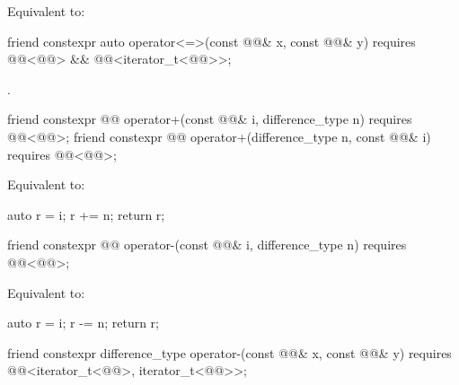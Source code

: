 \begin{itemdescr}
\pnum
\effects
Equivalent to: 
\end{itemdescr}

%
\begin{itemdecl}
friend constexpr auto operator<=>(const @@& x, const @@& y)
  requires @@<@@> && @@<iterator_t<@@>>;
\end{itemdecl}

\begin{itemdescr}
\pnum
\returns
{}.
\end{itemdescr}

%
\begin{itemdecl}
friend constexpr @@ operator+(const @@& i, difference_type n)
  requires @@<@@>;
friend constexpr @@ operator+(difference_type n, const @@& i)
  requires @@<@@>;
\end{itemdecl}

\begin{itemdescr}
\pnum
\effects
Equivalent to:
\begin{codeblock}
auto r = i;
r += n;
return r;
\end{codeblock}
\end{itemdescr}

%
\begin{itemdecl}
friend constexpr @@ operator-(const @@& i, difference_type n)
  requires @@<@@>;
\end{itemdecl}

\begin{itemdescr}
\pnum
\effects
Equivalent to:
\begin{codeblock}
auto r = i;
r -= n;
return r;
\end{codeblock}
\end{itemdescr}

%
\begin{itemdecl}
friend constexpr difference_type operator-(const @@& x, const @@& y)
  requires @@<iterator_t<@@>, iterator_t<@@>>;
\end{itemdecl}

